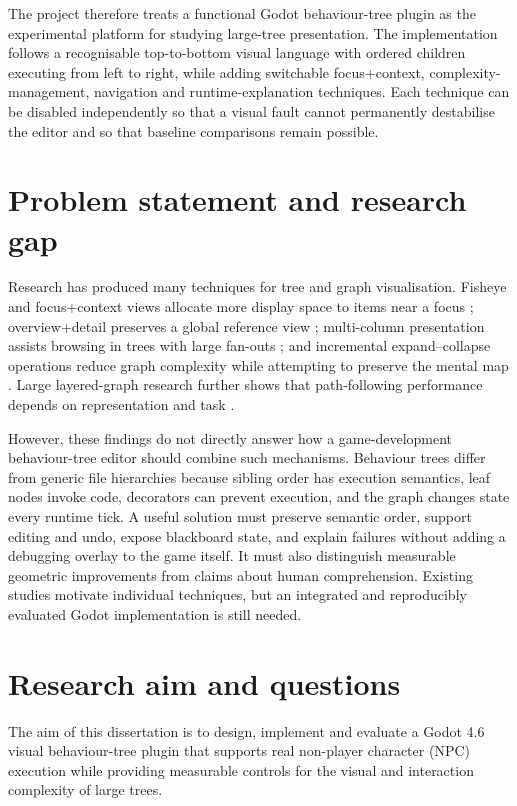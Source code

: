 The project therefore treats a functional Godot behaviour-tree plugin as the experimental platform for studying large-tree presentation. The implementation follows a recognisable top-to-bottom visual language with ordered children executing from left to right, while adding switchable focus+context, complexity-management, navigation and runtime-explanation techniques. Each technique can be disabled independently so that a visual fault cannot permanently destabilise the editor and so that baseline comparisons remain possible.

\section{Problem statement and research gap}

Research has produced many techniques for tree and graph visualisation. Fisheye and focus+context views allocate more display space to items near a focus \parencite{furnas1986fisheye,lamping1995hyperbolic}; overview+detail preserves a global reference view \parencite{cockburn2008review}; multi-column presentation assists browsing in trees with large fan-outs \parencite{song2010largefanout}; and incremental expand--collapse operations reduce graph complexity while attempting to preserve the mental map \parencite{dogrusoz2018complexity,misue1995mentalmap}. Large layered-graph research further shows that path-following performance depends on representation and task \parencite{bae2011quilts}.

However, these findings do not directly answer how a game-development behaviour-tree editor should combine such mechanisms. Behaviour trees differ from generic file hierarchies because sibling order has execution semantics, leaf nodes invoke code, decorators can prevent execution, and the graph changes state every runtime tick. A useful solution must preserve semantic order, support editing and undo, expose blackboard state, and explain failures without adding a debugging overlay to the game itself. It must also distinguish measurable geometric improvements from claims about human comprehension. Existing studies motivate individual techniques, but an integrated and reproducibly evaluated Godot implementation is still needed.

\section{Research aim and questions}

The aim of this dissertation is to design, implement and evaluate a Godot 4.6 visual behaviour-tree plugin that supports real non-player character (NPC) execution while providing measurable controls for the visual and interaction complexity of large trees.

